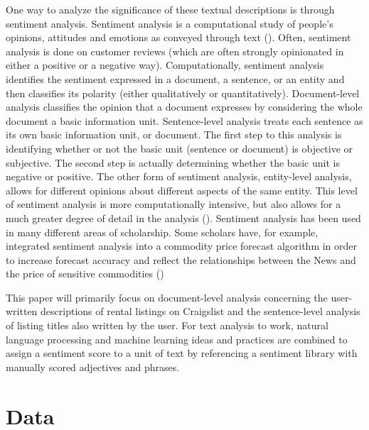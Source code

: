 \documentclass[12pt,english]{article}
\begin{document}
One way to analyze the significance of these textual descriptions is through sentiment analysis. Sentiment analysis is a computational study of people’s opinions, attitudes and emotions as conveyed through text (\citet{Medhat2014}). Often, sentiment analysis is done on customer reviews (which are often strongly opinionated in either a positive or a negative way). Computationally, sentiment analysis identifies the sentiment expressed in a document, a sentence, or an entity and then classifies its polarity (either qualitatively or quantitatively). Document-level analysis classifies the opinion that a document expresses by considering the whole document a basic information unit. Sentence-level analysis treats each sentence as its own basic information unit, or document. The first step to this analysis is identifying whether or not the basic unit (sentence or document) is objective or subjective. The second step is actually determining whether the basic unit is negative or positive. The other form of sentiment analysis, entity-level analysis, allows for different opinions about different aspects of the same entity. This level of sentiment analysis is more computationally intensive, but also allows for a much greater degree of detail in the analysis (\citet{Medhat2014}). Sentiment analysis has been used in many different areas of scholarship. Some scholars have, for example, integrated sentiment analysis into a commodity price forecast algorithm in order to increase forecast accuracy and reflect the relationships between the News and the price of sensitive commodities (\citet{Tseng2018})

This paper will primarily focus on document-level analysis concerning the user-written descriptions of rental listings on Craigslist and the sentence-level analysis of listing titles also written by the user. For text analysis to work, natural language processing and machine learning ideas and practices are combined to assign a sentiment score to a unit of text by referencing a sentiment library with manually scored adjectives and phrases. 

\section{Data}\label{sec:data}
\end{document}

